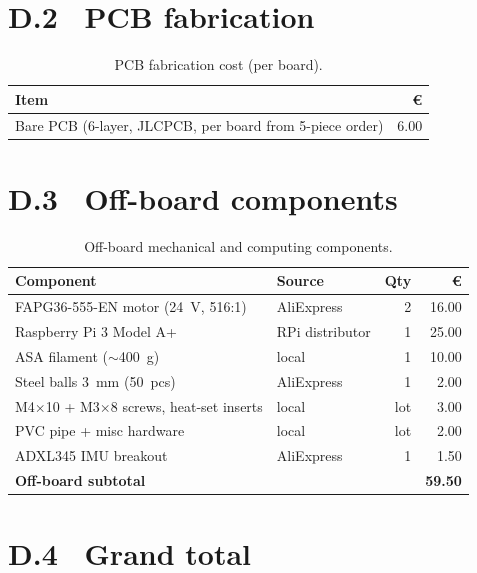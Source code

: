 \section*{D.2 \ PCB fabrication}

\begin{table}[H]
    \centering
    \begin{tabular}{lr}
        \toprule
        Item & \euro{} \\
        \midrule
        Bare PCB (6-layer, JLCPCB, per board from 5-piece order) & 6.00 \\
        \bottomrule
    \end{tabular}
    \caption{PCB fabrication cost (per board).}
    \label{tab:bom-pcb}
\end{table}

\section*{D.3 \ Off-board components}

\begin{table}[H]
    \centering
    \begin{tabular}{llrr}
        \toprule
        Component & Source & Qty & \euro{} \\
        \midrule
        FAPG36-555-EN motor (24~V, 516:1) & AliExpress & 2 & 16.00 \\
        Raspberry Pi 3 Model A+ & RPi distributor & 1 & 25.00 \\
        ASA filament ($\sim$400~g) & local & 1 & 10.00 \\
        Steel balls 3~mm (50~pcs) & AliExpress & 1 & 2.00 \\
        M4$\times$10 + M3$\times$8 screws, heat-set inserts & local & lot & 3.00 \\
        PVC pipe + misc hardware & local & lot & 2.00 \\
        ADXL345 IMU breakout & AliExpress & 1 & 1.50 \\
        \midrule
        \textbf{Off-board subtotal} & & & \textbf{59.50} \\
        \bottomrule
    \end{tabular}
    \caption{Off-board mechanical and computing components.}
    \label{tab:bom-off-board}
\end{table}

\section*{D.4 \ Grand total}

